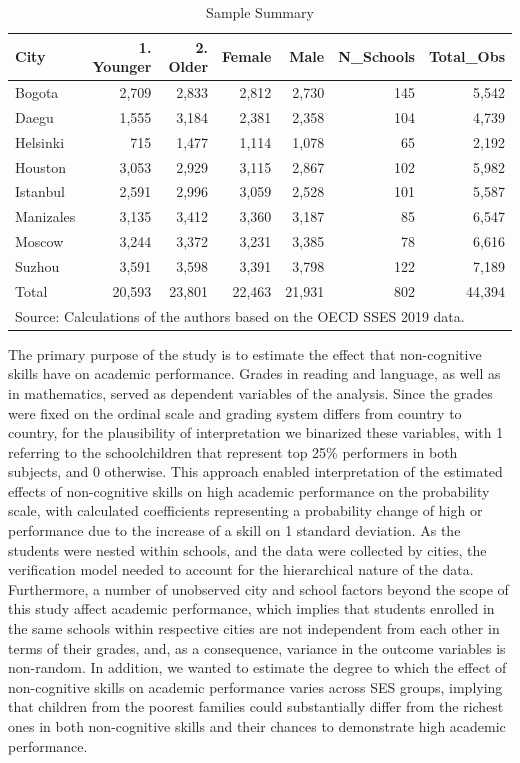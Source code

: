 \documentclass{article}
\begin{document}
\begin{table}

\caption{\label{tab:table-example}Sample Summary}
\centering
\begin{tabular}[t]{lrrrrrr}
\toprule
City & 1. Younger & 2. Older & Female & Male & N\_Schools & Total\_Obs\\
\midrule
Bogota & 2,709 & 2,833 & 2,812 & 2,730 & 145 & 5,542\\
Daegu & 1,555 & 3,184 & 2,381 & 2,358 & 104 & 4,739\\
Helsinki & 715 & 1,477 & 1,114 & 1,078 & 65 & 2,192\\
Houston & 3,053 & 2,929 & 3,115 & 2,867 & 102 & 5,982\\
Istanbul & 2,591 & 2,996 & 3,059 & 2,528 & 101 & 5,587\\
\addlinespace
Manizales & 3,135 & 3,412 & 3,360 & 3,187 & 85 & 6,547\\
Moscow & 3,244 & 3,372 & 3,231 & 3,385 & 78 & 6,616\\
Suzhou & 3,591 & 3,598 & 3,391 & 3,798 & 122 & 7,189\\
Total & 20,593 & 23,801 & 22,463 & 21,931 & 802 & 44,394\\
\bottomrule
\multicolumn{7}{l}{\rule{0pt}{1em}Source: Calculations of the authors based on the OECD SSES 2019 data.}\\
\end{tabular}
\end{table}

The primary purpose of the study is to estimate the effect that
non-cognitive skills have on academic performance. Grades in reading and
language, as well as in mathematics, served as dependent variables of
the analysis. Since the grades were fixed on the ordinal scale and
grading system differs from country to country, for the plausibility of
interpretation we binarized these variables, with 1 referring to the
schoolchildren that represent top 25\% performers in both subjects, and
0 otherwise. This approach enabled interpretation of the estimated
effects of non-cognitive skills on high academic performance on the
probability scale, with calculated coefficients representing a
probability change of high or performance due to the increase of a skill
on 1 standard deviation. As the students were nested within schools, and
the data were collected by cities, the verification model needed to
account for the hierarchical nature of the data. Furthermore, a number
of unobserved city and school factors beyond the scope of this study
affect academic performance, which implies that students enrolled in the
same schools within respective cities are not independent from each
other in terms of their grades, and, as a consequence, variance in the
outcome variables is non-random. In addition, we wanted to estimate the
degree to which the effect of non-cognitive skills on academic
performance varies across SES groups, implying that children from the
poorest families could substantially differ from the richest ones in
both non-cognitive skills and their chances to demonstrate high academic
performance.
\end{document}
